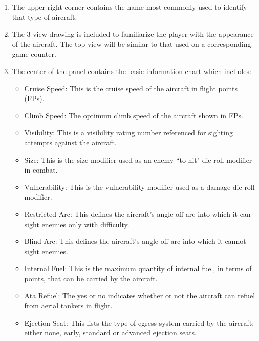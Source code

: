 \begin{enumerate}

    \item {}
        The upper right corner contains the name most commonly used to identify that type of aircraft. 

    \item {}
        The 3-view drawing is included to familiarize the player with the appearance of the aircraft. The top view will be similar to that used on a corresponding game counter.


    \item {}
        The center of the panel contains the basic information chart which includes:
        \begin{itemize}
            \item Cruise Speed: This is the cruise speed of the aircraft in flight points (FPs).
            \item Climb Speed: The optimum climb speed of the aircraft shown in FPs.
            \item Visibility: This is a visibility rating number referenced for sighting attempts against the aircraft.
            \item Size: This is the size modifier used as an enemy “to hit" die roll modifier in combat.
            \item Vulnerability: This is the vulnerability modifier used as a damage die roll modifier.
            \item Restricted Arc: This defines the aircraft's angle-off arc into which it can sight enemies only with difficulty.
            \item Blind Arc: This defines the aircraft's angle-off arc into which it cannot sight enemies.
            \item Internal Fuel: This is the maximum quantity of internal fuel, in terms of points, that can be carried by the aircraft.
            \item Ata Refuel: The yes or no indicates whether or not the aircraft can refuel from aerial tankers in flight.
            \item Ejection Seat: This lists the type of egress system carried by the aircraft; either none, early, standard or advanced ejection seats.
        \end{itemize}


\end{enumerate}
